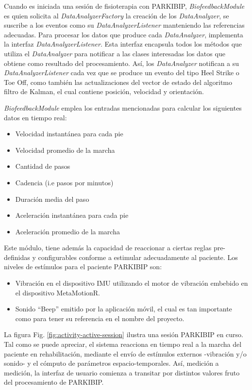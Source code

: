 Cuando es iniciada una sesión de fisioterapia con PARKIBIP, \textit{BiofeedbackModule} es quien solicita al \textit{DataAnalyzerFactory} la creación de los \textit{DataAnalyzer}, se suscribe a los eventos como su \textit{DataAnalyzerListener} manteniendo las referencias adecuadas. Para procesar los datos que produce cada \textit{DataAnalyzer}, implementa la interfaz \textit{DataAnalyzerListener}. Esta interfaz encapsula todos los métodos que utiliza el \textit{DataAnalyzer} para notificar a las clases interesadas los datos que obtiene como resultado del procesamiento. Así, los \textit{DataAnalyzer} notifican a su \textit{DataAnalyzerListener} cada vez que se produce un evento del tipo Heel Strike o Toe Off, como también las actualizaciones del vector de estado del algoritmo filtro de Kalman, el cual contiene posición, velocidad y orientación. 

\textit{BiofeedbackModule} emplea los entradas mencionadas para calcular los siguientes datos en tiempo real:

\begin{itemize}
    \item Velocidad instantánea para cada pie 
    \item Velocidad promedio de la marcha 
    \item Cantidad de pasos
    \item Cadencia (i.e pasos por minutos) 
    \item Duración media del paso 
    \item Aceleración instantánea para cada pie 
    \item Aceleración promedio de la marcha 
\end{itemize}

Este módulo, tiene además la capacidad de reaccionar a ciertas reglas pre-definidas y configurables conforme a estimular adecuadamente al paciente. Los niveles de estímulos para el paciente PARKIBIP son: 

\begin{itemize}
    \item Vibración en el dispositivo IMU utilizando el motor de vibración embebido en el dispositivo MetaMotionR.
    \item Sonido ``Beep'' emitido por la aplicación móvil, el cual es tan importante como para tener su referencia en el nombre del proyecto.
\end{itemize}

La figura Fig. \ref{fig:activity-active-session} ilustra una sesión PARKIBIP en curso. Tal como se puede apreciar, el sistema reacciona en tiempo real a la marcha del paciente en rehabilitación, mediante el envío de estímulos externos -vibración y/o sonido- y el cómputo de parámetros espacio-temporales. Así, medición a medición, la interfaz de usuario comienza a transitar por distintos valores fruto del procesamiento de PARKIBIP.  

